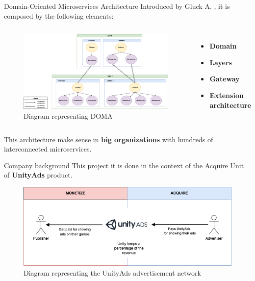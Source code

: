 \documentclass[10pt]{beamer}
\begin{document}
\begin{frame}{Domain-Oriented Microservices Architecture}
    Introduced by Gluck A. \cite{DOMAUber}, it is composed by the following elements:\\
    \vspace{0.5cm}
    \begin{columns}
        \begin{figure}
            \centering
            \includegraphics[width=\textwidth]{src/thesis/img/literature-review/doma.png}
            \caption{Diagram representing DOMA}
            \label{fig:my_label}
        \end{figure}
        
        \begin{itemize}
            \item \textbf{Domain}
            \item \textbf{Layers}
            \item \textbf{Gateway}
            \item \textbf{Extension architecture}
        \end{itemize}
    \end{columns}
    
    This architecture make sense in \textbf{big organizations} with hundreds of interconnected microservices.
\end{frame}

\begin{frame}{Company background}
    This project it is done in the context of the Acquire Unit of \textbf{UnityAds} product.
    
    \begin{figure}
        \centering
        \includegraphics[scale=0.35]{src/thesis/img/background/unity-ads.png}
        \caption{Diagram representing the UnityAds advertisement network}
        \label{fig:unity-ads}
    \end{figure}
\end{frame}
\end{document}
